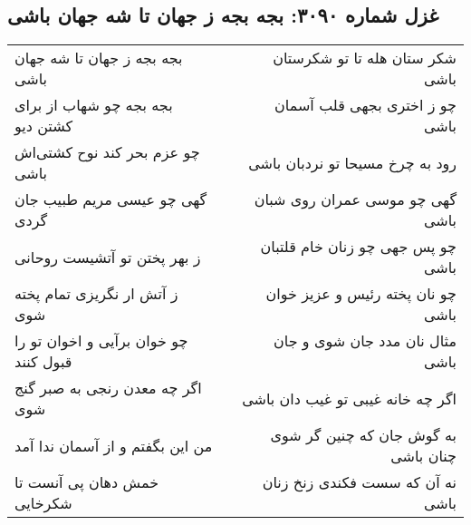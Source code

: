\begin{center}
\section*{غزل شماره ۳۰۹۰: بجه بجه ز جهان تا شه جهان باشی}
\label{sec:3090}
\begin{longtable}{l p{0.5cm} r}
بجه بجه ز جهان تا شه جهان باشی
&&
شکر ستان هله تا تو شکرستان باشی
\\
بجه بجه چو شهاب از برای کشتن دیو
&&
چو ز اختری بجهی قلب آسمان باشی
\\
چو عزم بحر کند نوح کشتی‌اش باشی
&&
رود به چرخ مسیحا تو نردبان باشی
\\
گهی چو عیسی مریم طبیب جان گردی
&&
گهی چو موسی عمران روی شبان باشی
\\
ز بهر پختن تو آتشیست روحانی
&&
چو پس جهی چو زنان خام قلتبان باشی
\\
ز آتش ار نگریزی تمام پخته شوی
&&
چو نان پخته رئیس و عزیز خوان باشی
\\
چو خوان برآیی و اخوان تو را قبول کنند
&&
مثال نان مدد جان شوی و جان باشی
\\
اگر چه معدن رنجی به صبر گنج شوی
&&
اگر چه خانه غیبی تو غیب دان باشی
\\
من این بگفتم و از آسمان ندا آمد
&&
به گوش جان که چنین گر شوی چنان باشی
\\
خمش دهان پی آنست تا شکرخایی
&&
نه آن که سست فکندی زنخ زنان باشی
\\
\end{longtable}
\end{center}
